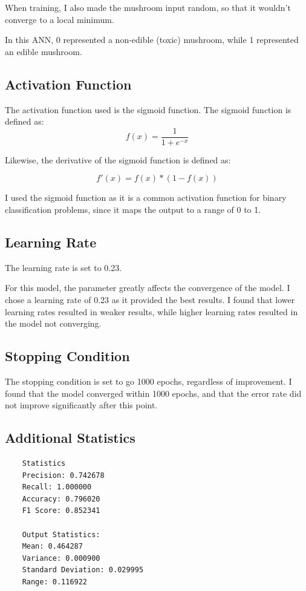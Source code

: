 \documentclass{article}
\begin{document}
When training, I also made the mushroom input random, so that it wouldn't converge to a local minimum.

In this ANN, 0 represented a non-edible (toxic) mushroom, while 1 represented an edible mushroom.

\subsection{Activation Function}
The activation function used is the sigmoid function. The sigmoid function is defined as:
\begin{equation}
    f(x) = \frac{1}{1 + e^{-x}}
\end{equation}

Likewise, the derivative of the sigmoid function is defined as:

\begin{equation}
    f'(x) = f(x) * (1 - f(x))
\end{equation}

I used the sigmoid function as it is a common activation function for binary classification problems, since it maps the output to a range of 0 to 1.

\subsection{Learning Rate}
The learning rate is set to 0.23. 

For this model, the parameter greatly affects the convergence of the model. I chose a learning rate of 0.23 as it provided the best results. I found that lower learning rates resulted in weaker results, while higher learning rates resulted in the model not converging.

\subsection{Stopping Condition}
The stopping condition is set to go 1000 epochs, regardless of improvement. I found that the model converged within 1000 epochs, and that the error rate did not improve significantly after this point.

\subsection{Additional Statistics}
\begin{verbatim}
    Statistics
    Precision: 0.742678
    Recall: 1.000000
    Accuracy: 0.796020
    F1 Score: 0.852341

    Output Statistics:
    Mean: 0.464287
    Variance: 0.000900
    Standard Deviation: 0.029995
    Range: 0.116922
\end{verbatim}
\end{document}
